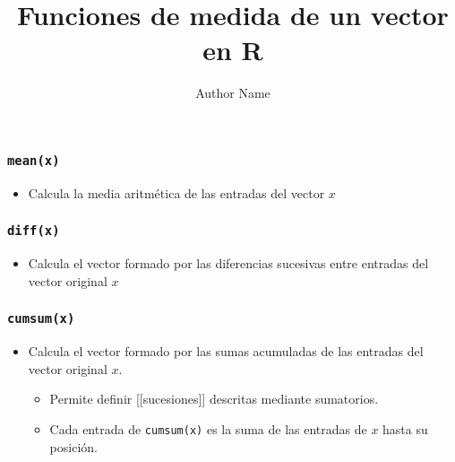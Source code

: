 \documentclass[
]{article}
\title{Funciones de medida de un vector en R}
\author{Author Name}
\date{}
\providecommand{\tightlist}{%
  \setlength{\itemsep}{0pt}\setlength{\parskip}{0pt}}
\begin{document}
\let\maketitle\relax  
\leading{6.5mm} 
\setlength\baselineskip{6.5mm} 
\setlength\lineskiplimit{-\maxdimen}

\maketitle

\hypertarget{meanx}{%
\subsubsection{\texorpdfstring{\texttt{mean(x)}}{mean(x)}}\label{meanx}}

\begin{itemize}
\tightlist
\item
  Calcula la media aritmética de las entradas del vector \(x\)
\end{itemize}

\hypertarget{diffx}{%
\subsubsection{\texorpdfstring{\texttt{diff(x)}}{diff(x)}}\label{diffx}}

\begin{itemize}
\tightlist
\item
  Calcula el vector formado por las diferencias sucesivas entre entradas
  del vector original \(x\)
\end{itemize}

\hypertarget{cumsumx}{%
\subsubsection{\texorpdfstring{\texttt{cumsum(x)}}{cumsum(x)}}\label{cumsumx}}

\begin{itemize}
\tightlist
\item
  Calcula el vector formado por las sumas acumuladas de las entradas del
  vector original \(x\).

  \begin{itemize}
  \tightlist
  \item
    Permite definir {[}{[}sucesiones{]}{]} descritas mediante
    sumatorios.
  \item
    Cada entrada de \texttt{cumsum(x)} es la suma de las entradas de
    \(x\) hasta su posición.
  \end{itemize}
\end{itemize}
\end{document}
